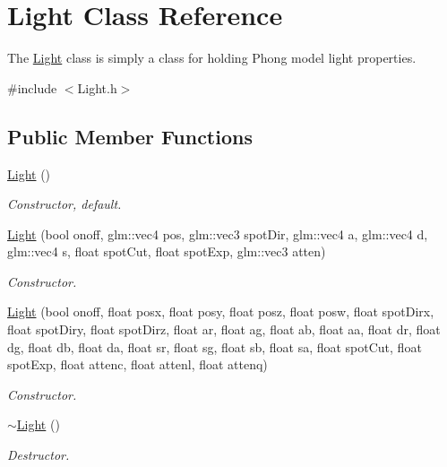 \hypertarget{class_light}{}\section{Light Class Reference}
\label{class_light}


The \hyperlink{class_light}{Light} class is simply a class for holding Phong model light properties.  




{\ttfamily \#include $<$Light.\+h$>$}

\subsection*{Public Member Functions}
\begin{DoxyCompactItemize}
\item 
\mbox{\label{class_light_aeb5df09a25a32f19fdffa761268ba24f}} 
\hyperlink{class_light_aeb5df09a25a32f19fdffa761268ba24f}{Light} ()
\begin{DoxyCompactList}\small\item\em Constructor, default. \end{DoxyCompactList}\item 
\hyperlink{class_light_aaaecc3a7601831f40c958da75e6f34ae}{Light} (bool onoff, glm\+::vec4 pos, glm\+::vec3 spot\+Dir, glm\+::vec4 a, glm\+::vec4 d, glm\+::vec4 s, float spot\+Cut, float spot\+Exp, glm\+::vec3 atten)
\begin{DoxyCompactList}\small\item\em Constructor. \end{DoxyCompactList}\item 
\hyperlink{class_light_ab31c2792d2d0c9ff04ff05c80ca60c8e}{Light} (bool onoff, float posx, float posy, float posz, float posw, float spot\+Dirx, float spot\+Diry, float spot\+Dirz, float ar, float ag, float ab, float aa, float dr, float dg, float db, float da, float sr, float sg, float sb, float sa, float spot\+Cut, float spot\+Exp, float attenc, float attenl, float attenq)
\begin{DoxyCompactList}\small\item\em Constructor. \end{DoxyCompactList}\item 
\hyperlink{class_light_ad0e59fad13bb6cfadc25b2c477e9ddc7}{$\sim$\+Light} ()
\begin{DoxyCompactList}\small\item\em Destructor. \end{DoxyCompactList}\item 

\end{DoxyCompactItemize}
